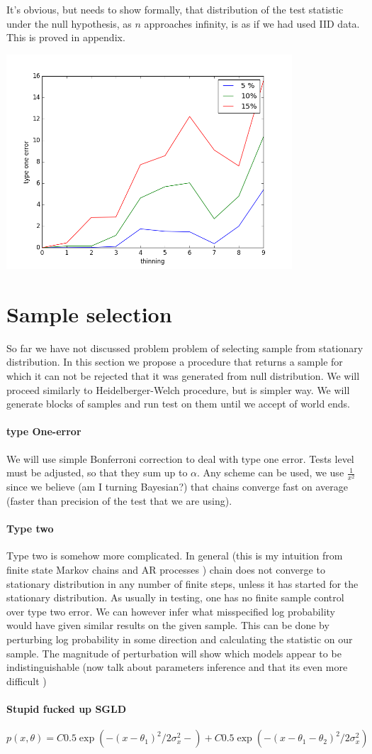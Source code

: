 \documentclass{article}
\begin{document}
It's obvious, but needs to show formally, that distribution of the test statistic under the null hypothesis, as $n$ approaches infinity, is as if we had used IID data. This is proved in appendix.

\includegraphics[width=0.8\textwidth]{type1.png}

\section{Sample selection}
So far we have not discussed problem problem of selecting sample from stationary distribution. In this section we propose a procedure that returns a sample for which it can not be rejected that it was generated from null distribution. We will proceed similarly to Heidelberger-Welch procedure, but is simpler way. We will generate blocks of samples and run test on them until we accept of world ends. 

\paragraph{type One-error}
We will use simple Bonferroni correction to deal with type one error. Tests level must be adjusted, so that they sum up to $\alpha$. Any scheme can be used, we use $\frac{1}{x^2}$ since we believe (am I turning  Bayesian?) that chains converge fast on average (faster than precision of the test that we are using).   

\paragraph{Type two}
Type two is somehow more complicated. In general (this is my intuition from finite state Markov chains and AR processes ) chain does not converge to stationary distribution in any number of finite steps, unless it has started for the stationary distribution. As usually in testing, one has no finite sample control over type two error. We can however infer what misspecified log probability would have given similar results on the given sample. This can be done by perturbing log probability in some direction and calculating the statistic on our sample. The magnitude of perturbation will show which models appear to be indistinguishable (now talk about parameters inference and that its even more difficult )    


\paragraph{Stupid fucked up SGLD}

\begin{equation}
 p(x, \theta) = C 0.5 \exp( -(x-\theta_1)^2/ 2\sigma_x^2 - ) + C 0.5 \exp( -(x-\theta_1 - \theta_2)^2/ 2\sigma_x^2)
\end{equation}
\end{document}
